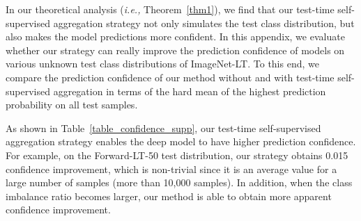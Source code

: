\documentclass{article}
\def\ie{\emph{i.e.}} \def\Ie{\emph{I.e.}}
\def\ie{\emph{i.e., }}
\begin{document}
In our theoretical analysis (\ie Theorem~\ref{thm1}), we find that our test-time self-supervised aggregation strategy   not only  simulates   the test class distribution, but also  makes  the model predictions more confident.   In this appendix, we evaluate whether our strategy can really improve  the prediction confidence of models on various unknown test class distributions of ImageNet-LT. To this end, we compare the prediction confidence of our method without  and  with test-time self-supervised aggregation in terms of the hard mean of the highest prediction probability on all test samples. 

As shown in   Table~\ref{table_confidence_supp}, our test-time self-supervised aggregation strategy enables the deep model to have higher prediction confidence. For example, on the Forward-LT-50 test distribution, our strategy obtains 0.015 confidence improvement, which is non-trivial since it is an average value for a large number of samples (more than 10,000 samples).  In addition,   when the class imbalance ratio becomes larger, our method is able to obtain more apparent confidence improvement.
  
\begin{table*}[h]  
	\caption{Comparison of prediction confidence between our method without  and  with test-time self-supervised aggregation on ImageNet-LT, in terms of the hard mean of the highest prediction probability on each sample. The higher the highest prediction, the better the model.}
	\label{table_confidence_supp}   
 \begin{center}
 \begin{threeparttable} 
	 \end{threeparttable}
	 \end{center}  
\end{table*}
  
\end{document}
